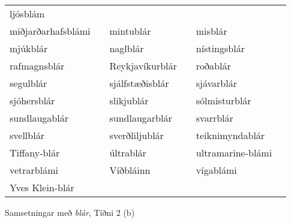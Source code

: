 \documentclass[../samsetningasafn.tex]{subfiles}
\begin{document}
\begin{wordlist}[H]
\begin{tcolorbox}
\begin{tabular}{BlBlBl}
		ljósblám			&		\\ 	%
		miðjarðarhafsblámi &		& 	
		mintublár		&		& 	
		misblár			&		\\ 	%
		mjúkblár		&		& 	
		naglblár			&		& 	
		nístingsblár		&		\\ 	%
		rafmagnsblár	&		& 	
		Reykjavíkurblár	&		& 	
		roðablár			&		\\ 	%
		segulblár		&		& 		
		sjálfstæðisblár	&		& 	
		sjávarblár		&		\\ 	%
		sjóhersblár		&		& 	
		slikjublár		&		& 		
		sólmisturblár	&		\\ 	%
		sundlaugablár	&		& 	
		sundlaugarblár	&		& 	
		svarrblár		&		\\ 	%
		svellblár			&		& 		
		sverðliljublár		&		& 		
		teiknimyndablár	&		\\  %
		Tiffany-blár		&		& 		
		últrablár			&		& 		
		ultramarine-blámi &		\\ 	%
		vetrarblámi		&		& 		
		Víðbláinn		&		& 		
		vígablámi		&		\\ 	%
		Yves Klein-blár	&		& 	
						&		&
						&
	\end{tabular}

\end{tcolorbox}
	\caption{Samsetningar með \textit{blár}, Tíðni 2 (b)}
	\label{listi:blatt.2b}
\end{wordlist}
\end{document}

